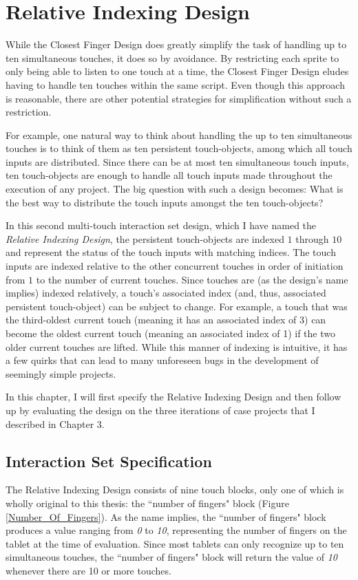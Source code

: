 \chapter{Relative Indexing Design}
While the Closest Finger Design does greatly simplify the task of handling up to ten simultaneous touches, it does so by avoidance. By restricting each sprite to only being able to listen to one touch at a time, the Closest Finger Design eludes having to handle ten touches within the same script. Even though this approach is reasonable, there are other potential strategies for simplification without such a restriction.

For example, one natural way to think about handling the up to ten simultaneous touches is to think of them as ten persistent touch-objects, among which all touch inputs are distributed. Since there can be at most ten simultaneous touch inputs, ten touch-objects are enough to handle all touch inputs made throughout the execution of any project. The big question with such a design becomes: What is the best way to distribute the touch inputs amongst the ten touch-objects?

In this second multi-touch interaction set design, which I have named the \emph{Relative Indexing Design}, the persistent touch-objects are indexed $1$ through $10$ and represent the status of the touch inputs with matching indices. The touch inputs are indexed relative to the other concurrent touches in order of initiation from $1$ to the number of current touches. Since touches are (as the design's name implies) indexed relatively, a touch's associated index (and, thus, associated persistent touch-object) can  be subject to change. For example, a touch that was the third-oldest current touch (meaning it has an associated index of 3) can become the oldest current touch (meaning an associated index of 1) if the two older current touches are lifted. While this manner of indexing is intuitive, it has a few quirks that can lead to many unforeseen bugs in the development of seemingly simple projects.

In this chapter, I will first specify the Relative Indexing Design and then follow up by evaluating the design on the three iterations of case projects that I described in Chapter 3.

\section{Interaction Set Specification}

The Relative Indexing Design consists of nine touch blocks, only one of which is wholly original to this thesis: the ``number of fingers" block (Figure \ref{Number_Of_Fingers}). As the name implies, the ``number of fingers" block produces a value ranging from \emph{0} to \emph{10}, representing the number of fingers on the tablet at the time of evaluation. Since most tablets can only recognize up to ten simultaneous touches, the ``number of fingers" block will return the value of \emph{10} whenever there are 10 or more touches.

